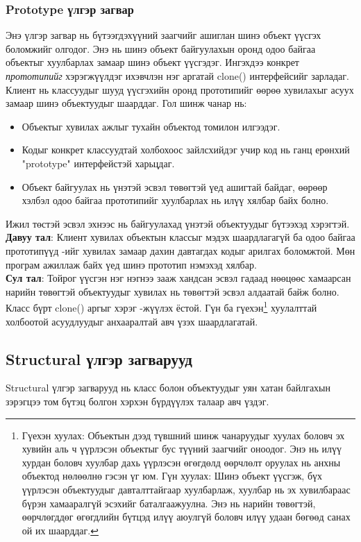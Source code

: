 \subsubsection{Prototype үлгэр загвар}
\quad \quad Энэ үлгэр загвар нь бүтээгдэхүүний заагчийг ашиглан шинэ объект үүсгэх боломжийг олгодог. Энэ нь шинэ объект байгуулахын оронд одоо байгаа объектыг хуулбарлах замаар шинэ объект үүсгэдэг. Ингэхдээ конкрет \textit{прототипийг} хэрэгжүүлдэг ихэвчлэн нэг аргатай clone() интерфейсийг зарладаг. Клиент нь классуудыг шууд үүсгэхийн оронд прототипийг өөрөө хувилахыг асуух замаар шинэ объектуудыг шаарддаг. Гол шинж чанар нь:
\begin{itemize}
	\item Объектыг хувилах ажлыг тухайн объектод томилон илгээдэг.
	\item Кодыг конкрет классуудтай холбохоос зайлсхийдэг учир код нь ганц ерөнхий "prototype" интерфейстэй харьцдаг.
	\item Объект байгуулах нь үнэтэй эсвэл төвөгтэй үед ашигтай байдаг, өөрөөр хэлбэл одоо байгаа прототипийг хуулбарлах нь илүү хялбар байх болно.
\end{itemize}
Ижил төстэй эсвэл эхнээс нь байгуулахад үнэтэй объектуудыг бүтээхэд хэрэгтэй.\\
\textbf{Давуу тал}: Клиент хувилах объектын классыг мэдэх шаардлагагүй ба одоо байгаа прототипүүд -ийг хувилах замаар дахин давтагдах кодыг арилгах боломжтой. Мөн програм ажиллаж байх үед шинэ прототип нэмэхэд хялбар.\\
\textbf{Сул тал}: Тойрог үүсгэн нэг нэгнээ зааж хандсан эсвэл гадаад нөөцөөс хамаарсан нарийн төвөгтэй объектуудыг хувилах нь төвөгтэй эсвэл алдаатай байж болно. Класс бүрт  clone()  аргыг хэрэг -жүүлэх ёстой. Гүн ба гүехэн\footnote{
	Гүехэн хуулах: Объектын дээд түвшний шинж чанаруудыг хуулах боловч эх хувийн аль ч үүрлэсэн объектыг бус түүний заагчийг оноодог. Энэ нь илүү хурдан боловч хуулбар дахь үүрлэсэн өгөгдөлд өөрчлөлт оруулах нь анхны объектод нөлөөлнө гэсэн үг юм.
	Гүн хуулах: Шинэ объект үүсгэж, бүх үүрлэсэн объектуудыг давталттайгаар хуулбарлаж, хуулбар нь эх хувилбараас бүрэн хамааралгүй эсэхийг баталгаажуулна. Энэ нь нарийн төвөгтэй, өөрчлөгддөг өгөгдлийн бүтцэд илүү аюулгүй боловч илүү удаан бөгөөд санах ой их шаарддаг.
} хуулалттай холбоотой асуудлуудыг анхааралтай авч үзэх шаардлагатай.

\subsection{Structural үлгэр загварууд}
Structural үлгэр загварууд нь класс болон объектуудыг уян хатан байлгахын зэрэгцээ том бүтэц болгон хэрхэн бүрдүүлэх талаар авч үздэг.




